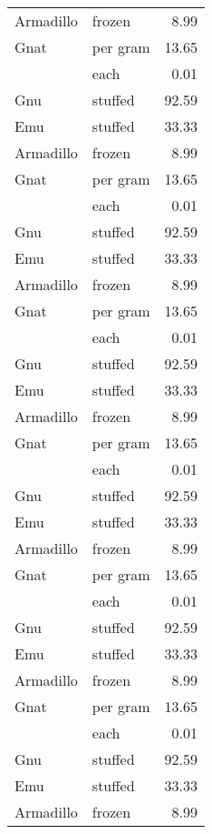 {\begin{center}
\begin{xtabular}{|l|l|r|}
Armadillo & frozen   & 8.99  \\
Gnat      & per gram & 13.65 \\
          & each     & 0.01  \\
Gnu       & stuffed  & 92.59 \\
Emu       & stuffed  & 33.33 \\
Armadillo & frozen   & 8.99  \\
Gnat      & per gram & 13.65 \\
          & each     & 0.01  \\
Gnu       & stuffed  & 92.59 \\
Emu       & stuffed  & 33.33 \\
Armadillo & frozen   & 8.99  \\
Gnat      & per gram & 13.65 \\
          & each     & 0.01  \\
Gnu       & stuffed  & 92.59 \\
Emu       & stuffed  & 33.33 \\
Armadillo & frozen   & 8.99  \\
Gnat      & per gram & 13.65 \\
          & each     & 0.01  \\
Gnu       & stuffed  & 92.59 \\
Emu       & stuffed  & 33.33 \\
Armadillo & frozen   & 8.99  \\
Gnat      & per gram & 13.65 \\
          & each     & 0.01  \\
Gnu       & stuffed  & 92.59 \\
Emu       & stuffed  & 33.33 \\
Armadillo & frozen   & 8.99  \\
Gnat      & per gram & 13.65 \\
          & each     & 0.01  \\
Gnu       & stuffed  & 92.59 \\
Emu       & stuffed  & 33.33 \\
Armadillo & frozen   & 8.99  \\
\hline
\end{xtabular}
\end{center}
} 
